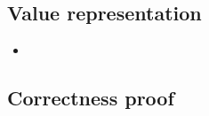 \subsection{Value representation}
\begin{itemize}

\item {}

\begin{comment}
\PT{
	\AC{\ValRep {\lrange{v_1}{v_k}} {\tau} {\v}}
	\UC{\ValRep {\Seqk{v}}{\tseq{\tau}}{(\v,\langle \F_1,..., \F_k, \T \rangle)}}
}\\[4ex]

\item \Jug{\ValRep{\lrange{v_1}{v_k}}{\tau}{\v}}
\PT{
	\Axiom{\ValRep{\lrange{n_1}{n_k}}{\int}{\vrange{n_1}{n_k}}}
}
\PT{
	\AC{\ValRep{v_i}{\tau}{\v}}
	\UC{\ValRep{\lrange{v_1}{v_k}}{\tseq{\tau}}{}}
}

\end{comment}

\end{itemize}
\subsection{Correctness proof}
